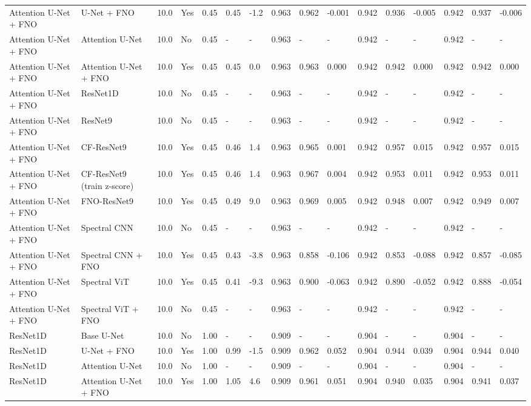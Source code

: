 \begin{longtable}{llllllllllllllll}
Attention U-Net + FNO & U-Net + FNO & 10.0 & Yes & 0.45 & 0.45 & -1.2 & 0.963 & 0.962 & -0.001 & 0.942 & 0.936 & -0.005 & 0.942 & 0.937 & -0.006 \\
Attention U-Net + FNO & Attention U-Net & 10.0 & No & 0.45 & - & - & 0.963 & - & - & 0.942 & - & - & 0.942 & - & - \\
Attention U-Net + FNO & Attention U-Net + FNO & 10.0 & Yes & 0.45 & 0.45 & 0.0 & 0.963 & 0.963 & 0.000 & 0.942 & 0.942 & 0.000 & 0.942 & 0.942 & 0.000 \\
Attention U-Net + FNO & ResNet1D & 10.0 & No & 0.45 & - & - & 0.963 & - & - & 0.942 & - & - & 0.942 & - & - \\
Attention U-Net + FNO & ResNet9 & 10.0 & No & 0.45 & - & - & 0.963 & - & - & 0.942 & - & - & 0.942 & - & - \\
Attention U-Net + FNO & CF-ResNet9 & 10.0 & Yes & 0.45 & 0.46 & 1.4 & 0.963 & 0.965 & 0.001 & 0.942 & 0.957 & 0.015 & 0.942 & 0.957 & 0.015 \\
Attention U-Net + FNO & CF-ResNet9 (train z-score) & 10.0 & Yes & 0.45 & 0.46 & 1.4 & 0.963 & 0.967 & 0.004 & 0.942 & 0.953 & 0.011 & 0.942 & 0.953 & 0.011 \\
Attention U-Net + FNO & FNO-ResNet9 & 10.0 & Yes & 0.45 & 0.49 & 9.0 & 0.963 & 0.969 & 0.005 & 0.942 & 0.948 & 0.007 & 0.942 & 0.949 & 0.007 \\
Attention U-Net + FNO & Spectral CNN & 10.0 & No & 0.45 & - & - & 0.963 & - & - & 0.942 & - & - & 0.942 & - & - \\
Attention U-Net + FNO & Spectral CNN + FNO & 10.0 & Yes & 0.45 & 0.43 & -3.8 & 0.963 & 0.858 & -0.106 & 0.942 & 0.853 & -0.088 & 0.942 & 0.857 & -0.085 \\
Attention U-Net + FNO & Spectral ViT & 10.0 & Yes & 0.45 & 0.41 & -9.3 & 0.963 & 0.900 & -0.063 & 0.942 & 0.890 & -0.052 & 0.942 & 0.888 & -0.054 \\
Attention U-Net + FNO & Spectral ViT + FNO & 10.0 & No & 0.45 & - & - & 0.963 & - & - & 0.942 & - & - & 0.942 & - & - \\
ResNet1D & Base U-Net & 10.0 & No & 1.00 & - & - & 0.909 & - & - & 0.904 & - & - & 0.904 & - & - \\
ResNet1D & U-Net + FNO & 10.0 & Yes & 1.00 & 0.99 & -1.5 & 0.909 & 0.962 & 0.052 & 0.904 & 0.944 & 0.039 & 0.904 & 0.944 & 0.040 \\
ResNet1D & Attention U-Net & 10.0 & No & 1.00 & - & - & 0.909 & - & - & 0.904 & - & - & 0.904 & - & - \\
ResNet1D & Attention U-Net + FNO & 10.0 & Yes & 1.00 & 1.05 & 4.6 & 0.909 & 0.961 & 0.051 & 0.904 & 0.940 & 0.035 & 0.904 & 0.941 & 0.037 \\

\end{longtable}
